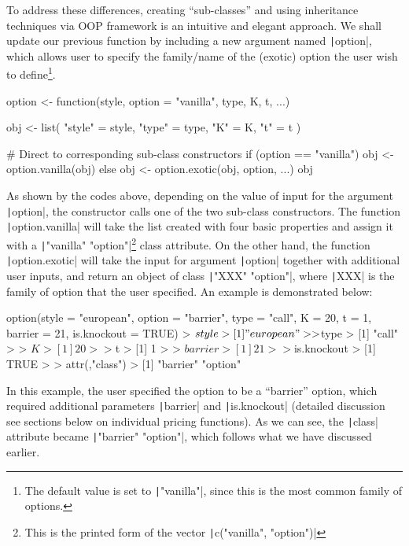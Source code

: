 To address these differences, creating ``sub-classes'' and using inheritance techniques via OOP framework is an intuitive and elegant approach. We shall update our previous function by including a new argument named \texttt|option|, which allows user to specify the family/name of the (exotic) option the user wish to define\footnote{The default value is set to \texttt|"vanilla"|, since this is the most common family of options.}.

\begin{Rminted}
option <- function(style, option = "vanilla", type, K, t, ...) {

    obj <- list(
        "style" = style,
        "type" = type,
        "K" = K,
        "t" = t
    )

    # Direct to corresponding sub-class constructors
    if (option == "vanilla") {
        obj <- option.vanilla(obj)
    } else {
        obj <- option.exotic(obj, option, ...)
    }
    obj
}
\end{Rminted}

As shown by the codes above, depending on the value of input for the argument \texttt|option|, the constructor calls one of the two sub-class constructors. The function \texttt|option.vanilla| will take the list created with four basic properties and assign it with a \texttt|"vanilla" "option"|\footnote{This is the printed form of the vector \texttt|c("vanilla", "option")|} class attribute. On the other hand, the function \texttt|option.exotic| will take the input for argument \texttt|option| together with additional user inputs, and return an object of class \texttt|"XXX" "option"|, where \texttt|XXX| is the family of option that the user specified. An example is demonstrated below:

\begin{Rminted}
option(style = "european",
       option = "barrier",
       type = "call",
       K = 20,
       t = 1,
       barrier = 21,
       is.knockout = TRUE)
> $style
> [1] "european"
> 
> $type
> [1] "call"
> 
> $K
> [1] 20
> 
> $t
> [1] 1
> 
> $barrier
> [1] 21
> 
> $is.knockout
> [1] TRUE
> 
> attr(,"class")
> [1] "barrier" "option"
\end{Rminted}

In this example, the user specified the option to be a ``barrier'' option, which required additional parameters \texttt|barrier| and \texttt|is.knockout| (detailed discussion see sections below on individual pricing functions). As we can see, the \texttt|class| attribute became \texttt|"barrier" "option"|, which follows what we have discussed earlier.

